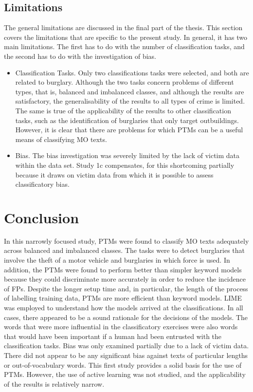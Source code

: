 \subsection{Limitations} The general limitations are discussed in the final part of the thesis. This section covers the limitations that are specific to the present study. In general, it has two main limitations. The first has to do with the number of classification tasks, and the second has to do with the investigation of bias.

\begin{itemize}
    \item Classification Tasks. Only two classifications tasks were selected, and both are related to burglary. Although the two tasks concern problems of different types, that is, balanced and imbalanced classes, and although the results are satisfactory, the generalisability of the results to all types of crime is limited. The same is true of the applicability of the results to other classification tasks, such as the identification of burglaries that only target outbuildings. However, it is clear that there are problems for which PTMs can be a useful means of classifying MO texts.
    
    \item Bias. The bias investigation was severely limited by the lack of victim data within the data set. Study 1c compensates, for this shortcoming partially because it draws on victim data from which it is possible to assess classificatory bias.
    
\end{itemize}

\section{Conclusion} In this narrowly focused study, PTMs were found to classify MO texts adequately across balanced and imbalanced classes. The tasks were to detect burglaries that involve the theft of a motor vehicle and burglaries in which force is used. In addition, the PTMs were found to perform better than simpler keyword models because they could discriminate more accurately in order to reduce the incidence of FPs. Despite the longer setup time and, in particular, the length of the process of labelling training data, PTMs are more efficient than keyword models. LIME was employed to understand how the models arrived at the classifications. In all cases, there appeared to be a sound rationale for the decisions of the models. The words that were more influential in the classificatory exercises were also words that would have been important if a human had been entrusted with the classification tasks. Bias was only examined partially due to a lack of victim data. There did not appear to be any significant bias against texts of particular lengths or out-of-vocabulary words. This first study provides a solid basis for the use of PTMs. However, the use of active learning was not studied, and the applicability of the results is relatively narrow.

